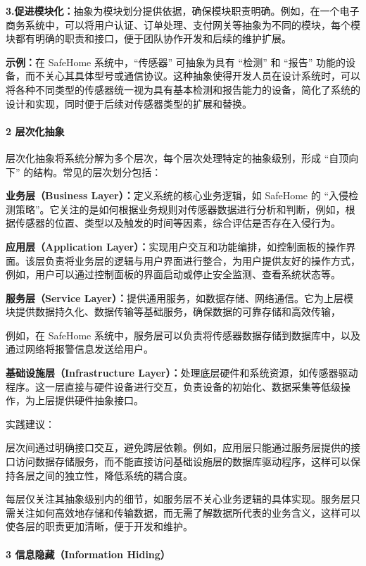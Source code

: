 \textbf{3.促进模块化：}抽象为模块划分提供依据，确保模块职责明确。例如，在一个电子商务系统中，可以将用户认证、订单处理、支付网关等抽象为不同的模块，每个模块都有明确的职责和接口，便于团队协作开发和后续的维护扩展。

\textbf{示例：}在 SafeHome 系统中，``传感器'' 可抽象为具有 ``检测'' 和 ``报告'' 功能的设备，而不关心其具体型号或通信协议。这种抽象使得开发人员在设计系统时，可以将各种不同类型的传感器统一视为具有基本检测和报告能力的设备，简化了系统的设计和实现，同时便于后续对传感器类型的扩展和替换。

\paragraph{2 层次化抽象}\label{ux5c42ux6b21ux5316ux62bdux8c61}

层次化抽象将系统分解为多个层次，每个层次处理特定的抽象级别，形成 ``自顶向下'' 的结构。常见的层次划分包括：

\textbf{业务层（Business Layer）：}定义系统的核心业务逻辑，如 SafeHome 的 ``入侵检测策略''。它关注的是如何根据业务规则对传感器数据进行分析和判断，例如，根据传感器的位置、类型以及触发的时间等因素，综合评估是否存在入侵行为。

\textbf{应用层（Application Layer）：}实现用户交互和功能编排，如控制面板的操作界面。该层负责将业务层的逻辑与用户界面进行整合，为用户提供友好的操作方式，例如，用户可以通过控制面板的界面启动或停止安全监测、查看系统状态等。

\textbf{服务层（Service Layer）：}提供通用服务，如数据存储、网络通信。它为上层模块提供数据持久化、数据传输等基础服务，确保数据的可靠存储和高效传输，

例如，在 SafeHome 系统中，服务层可以负责将传感器数据存储到数据库中，以及通过网络将报警信息发送给用户。

\textbf{基础设施层（Infrastructure Layer）：}处理底层硬件和系统资源，如传感器驱动程序。这一层直接与硬件设备进行交互，负责设备的初始化、数据采集等低级操作，为上层提供硬件抽象接口。

实践建议：

层次间通过明确接口交互，避免跨层依赖。例如，应用层只能通过服务层提供的接口访问数据存储服务，而不能直接访问基础设施层的数据库驱动程序，这样可以保持各层之间的独立性，降低系统的耦合度。

每层仅关注其抽象级别内的细节，如服务层不关心业务逻辑的具体实现。服务层只需关注如何高效地存储和传输数据，而无需了解数据所代表的业务含义，这样可以使各层的职责更加清晰，便于开发和维护。

\paragraph{3 信息隐藏（Information Hiding）}\label{ux4fe1ux606fux9690ux85cfinformation-hiding}

